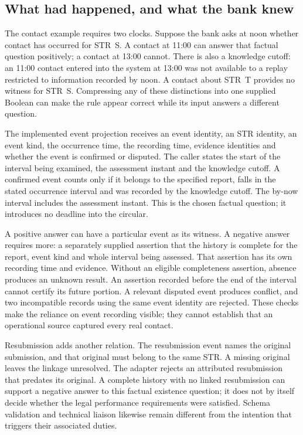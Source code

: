 \subsection{What had happened, and what the bank knew}

The contact example requires two clocks. Suppose the bank asks at noon whether
contact has occurred for STR~S. A contact at 11:00 can answer that factual
question positively; a contact at 13:00 cannot. There is also a knowledge
cutoff: an 11:00 contact entered into the system at 13:00 was not available to a
replay restricted to information recorded by noon. A contact about STR~T
provides no witness for STR~S. Compressing any of these distinctions into one
supplied Boolean can make the rule appear correct while its input answers a
different question.

The implemented event projection receives an event identity, an STR identity,
an event kind, the occurrence time, the recording time, evidence identities and
whether the event is confirmed or disputed. The caller states the start of the
interval being examined, the assessment instant and the knowledge cutoff. A
confirmed event counts only if it belongs to the specified report, falls in
the stated occurrence interval and was recorded by the knowledge cutoff. The
by-now interval includes the assessment instant. This is the chosen factual
question; it introduces no deadline into the circular.

A positive answer can have a particular event as its witness. A negative answer
requires more: a separately supplied assertion that the history is complete
for the report, event kind and whole interval being assessed. That assertion
has its own recording time and evidence. Without an eligible completeness
assertion, absence produces an unknown result. An assertion recorded before
the end of the interval cannot certify its future portion. A relevant disputed
event produces conflict, and two incompatible records using the same event
identity are rejected. These checks make the reliance on event recording
visible; they cannot establish that an operational source captured every real
contact.

Resubmission adds another relation. The resubmission event names the original
submission, and that original must belong to the same STR. A missing original
leaves the linkage unresolved. The adapter rejects an attributed resubmission
that predates its original. A complete history with no linked resubmission can
support a negative answer to this factual existence question; it does not by
itself decide whether the legal performance requirements were satisfied.
Schema validation and technical liaison likewise remain different from the
intention that triggers their associated duties.

